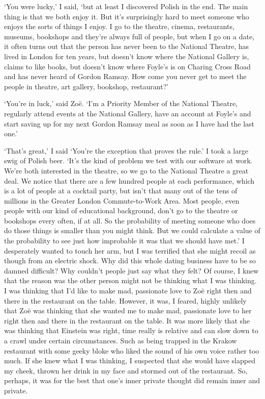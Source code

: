 `You were lucky,' I said, `but at least I discovered Polish in the
end. The main thing is that we both enjoy it. But it's surprisingly
hard to meet someone who enjoys the sorts of things I enjoy. I go to
the theatre, cinema, restaurants, museums, bookshops and they're
always full of people, but when I go on a date, it often turns out
that the person has never been to the National Theatre, has lived in
London for ten years, but doesn't know where the National Gallery
is, claims to like books, but doesn't know where Foyle's is on
Charing Cross Road and has never heard of Gordon Ramsay. How come
you never get to meet the people in theatre, art gallery, bookshop,
restaurant?'

`You're in luck,' said Zoë. `I'm a Priority Member of the
National Theatre, regularly attend events at the National Gallery,
have an account at Foyle's and start saving up for my next Gordon
Ramsay meal as soon as I have had the last one.'

`That's great,' I said `You're the exception that proves the rule.'
I took a large swig of Polish beer. `It's the kind of problem we
test with our software at work. We're both interested in the
theatre, so we go to the National Theatre a great deal. We notice
that there are a few hundred people at each performance, which is a
lot of people at a cocktail party, but isn't that many out of the
tens of millions in the Greater London Commute-to-Work Area. Most
people, even people with our kind of educational background, don't
go to the theatre or bookshops every often, if at all. So the
probability of meeting someone who does do those things is smaller
than you might think. But we could calculate a value of the
probability to see just how improbable it was that we should have
met.' I desperately wanted to touch her arm, but I was terrified
that she might recoil as though from an electric shock. Why did this
whole dating business have to be so damned difficult? Why couldn't
people just say what they felt? Of course, I knew that the reason
was the other person might not be thinking what I was thinking. I
was thinking that I'd like to make mad, passionate love to Zoë
right then and there in the restaurant on the table. However, it
was, I feared, highly unlikely that Zoë was thinking that she
wanted me to make mad, passionate love to her right then and there
in the restaurant on the table. It was more likely that she was
thinking that Einstein was right, time really is relative and can
slow down to a crawl under certain circumstances. Such as being
trapped in the Krakow restaurant with some geeky bloke who liked the
sound of his own voice rather too much. If she knew what I was
thinking, I suspected that she would have slapped my cheek, thrown
her drink in my face and stormed out of the restaurant. So, perhaps,
it was for the best that one's inner private thought did remain
inner and private.

